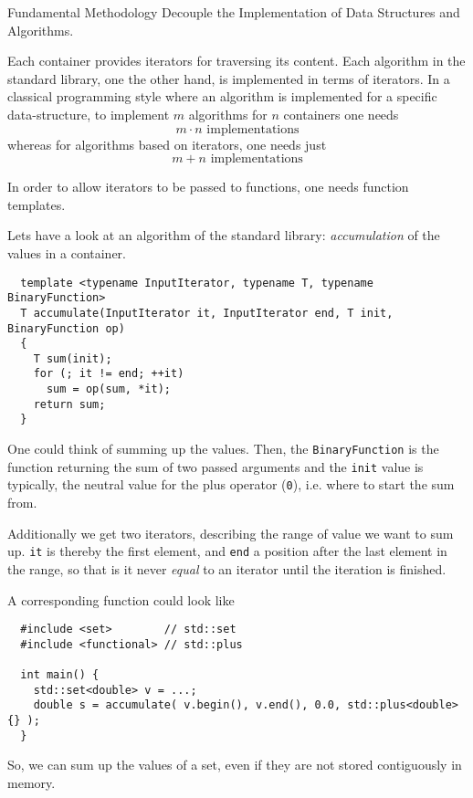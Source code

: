 \begin{guideline}{Fundamental Methodology}
  Decouple the Implementation of Data Structures and Algorithms.
\end{guideline}

Each container provides iterators for traversing its content. Each algorithm in the standard library, one the other hand, is implemented in terms
of iterators. In a classical programming style where an algorithm is implemented for a specific data-structure, to implement $m$ algorithms for
$n$ containers one needs
\[
  m\cdot n\text{ implementations}
\]
whereas for algorithms based on iterators, one needs just
\[
  m+n\text{ implementations}
\]

In order to allow iterators to be passed to functions, one needs function templates.

\begin{example}
  Lets have a look at an algorithm of the standard library: \emph{accumulation} of the values in a container.
  \begin{verbatim}
  template <typename InputIterator, typename T, typename BinaryFunction>
  T accumulate(InputIterator it, InputIterator end, T init, BinaryFunction op)
  {
    T sum(init);
    for (; it != end; ++it)
      sum = op(sum, *it);
    return sum;
  }
  \end{verbatim}

  One could think of summing up the values. Then, the \texttt{BinaryFunction} is the function returning
  the sum of two passed arguments and the \texttt{init} value is typically, the neutral value for the plus
  operator (\texttt{0}), i.e. where to start the sum from.

  Additionally we get two iterators, describing the range of value we want to sum up. \texttt{it} is thereby the
  first element, and \texttt{end} a position after the last element in the range, so that is it never \textit{equal}
  to an iterator until the iteration is finished.

  A corresponding  function could look like
  \begin{verbatim}
  #include <set>        // std::set
  #include <functional> // std::plus

  int main() {
    std::set<double> v = ...;
    double s = accumulate( v.begin(), v.end(), 0.0, std::plus<double>{} );
  }
  \end{verbatim}
  So, we can sum up the values of a set, even if they are not stored contiguously in memory.
\end{example}


